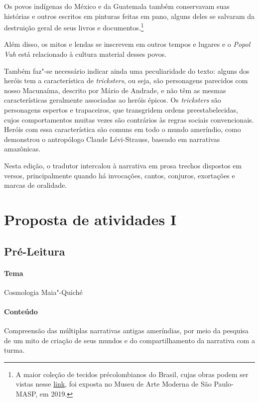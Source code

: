 \documentclass[11pt]{extarticle}
\begin{document}
Os povos indígenas do México e da Guatemala também conservavam suas histórias e outros escritos em pinturas feitas em pano, alguns deles se salvaram da destruição geral de seus livros e documentos.\footnote{A maior coleção de tecidos précolombianos do Brasil, cujas obras podem ser vistas nesse \href{https://masp.org.br/exposicoes/acervo-em-transformacao-comodato-masp-landmann-texteis-pre-colombianos}{link}, foi exposta no Museu de Arte Moderna de São Paulo-MASP, em 2019.}

Além disso, os mitos e lendas se inscrevem em outros tempos e lugares e o 
\textit{Popol Vuh} está relacionado à cultura material desses povos.

Também faz"-se necessário indicar ainda uma peculiaridade do texto: alguns dos heróis tem a característica de \textit{tricksters}, ou seja, são personagens parecidos com nosso Macunaíma, descrito por Mário de Andrade, e não têm as mesmas características geralmente associadas ao heróis épicos. Os \textit{tricksters} são personagens espertos e trapaceiros, que transgridem ordens preestabelecidas, cujos comportamentos muitas vezes são contrários às regras sociais convencionais.
Heróis com essa característica são comuns em todo o mundo ameríndio, como demonstrou o antropólogo Claude Lévi-Strauss, baseado em narrativas amazônicas.

Nesta edição, o tradutor intercalou à narrativa em prosa trechos dispostos em versos, principalmente quando há invocações, cantos, conjuros, exortações e marcas de oralidade.


\section{Proposta de atividades I}

\subsection{Pré-Leitura}

\paragraph{Tema} Cosmologia Maia"-Quiché

\paragraph{Conteúdo} Compreensão das múltiplas narrativas antigas ameríndias, por meio da pesquisa 
de um mito de criação de seus mundos e do compartilhamento da narrativa com a turma.
\end{document}
